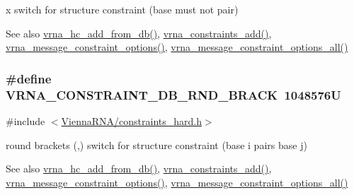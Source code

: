 \textquotesingle{}x\textquotesingle{} switch for structure constraint (base must not pair) 

\begin{DoxySeeAlso}{See also}
\hyperlink{group__hard__constraints_ga5b4de3247b67358080c176b94591a8e6}{vrna\+\_\+hc\+\_\+add\+\_\+from\+\_\+db()}, \hyperlink{group__constraints_ga35a401f680969a556858a8dd5f1d07cc}{vrna\+\_\+constraints\+\_\+add()}, \hyperlink{group__constraints_gaa1f20b53bf09ac2e6b0dbb13f7d89670}{vrna\+\_\+message\+\_\+constraint\+\_\+options()}, \hyperlink{group__constraints_gaec7e13fa0465c2acc7a621d1aecb709f}{vrna\+\_\+message\+\_\+constraint\+\_\+options\+\_\+all()} 
\end{DoxySeeAlso}
\subsubsection[{\texorpdfstring{V\+R\+N\+A\+\_\+\+C\+O\+N\+S\+T\+R\+A\+I\+N\+T\+\_\+\+D\+B\+\_\+\+R\+N\+D\+\_\+\+B\+R\+A\+CK}{VRNA_CONSTRAINT_DB_RND_BRACK}}]{\setlength{\rightskip}{0pt plus 5cm}\#define V\+R\+N\+A\+\_\+\+C\+O\+N\+S\+T\+R\+A\+I\+N\+T\+\_\+\+D\+B\+\_\+\+R\+N\+D\+\_\+\+B\+R\+A\+CK~1048576U}\hypertarget{group__hard__constraints_gac17b034852c914bc5879954c65d7e74b}{}\label{group__hard__constraints_gac17b034852c914bc5879954c65d7e74b}


{\ttfamily \#include $<$\hyperlink{constraints__hard_8h}{Vienna\+R\+N\+A/constraints\+\_\+hard.\+h}$>$}



round brackets \textquotesingle{}(\textquotesingle{},\textquotesingle{})\textquotesingle{} switch for structure constraint (base i pairs base j) 

\begin{DoxySeeAlso}{See also}
\hyperlink{group__hard__constraints_ga5b4de3247b67358080c176b94591a8e6}{vrna\+\_\+hc\+\_\+add\+\_\+from\+\_\+db()}, \hyperlink{group__constraints_ga35a401f680969a556858a8dd5f1d07cc}{vrna\+\_\+constraints\+\_\+add()}, \hyperlink{group__constraints_gaa1f20b53bf09ac2e6b0dbb13f7d89670}{vrna\+\_\+message\+\_\+constraint\+\_\+options()}, \hyperlink{group__constraints_gaec7e13fa0465c2acc7a621d1aecb709f}{vrna\+\_\+message\+\_\+constraint\+\_\+options\+\_\+all()} 
\end{DoxySeeAlso}
